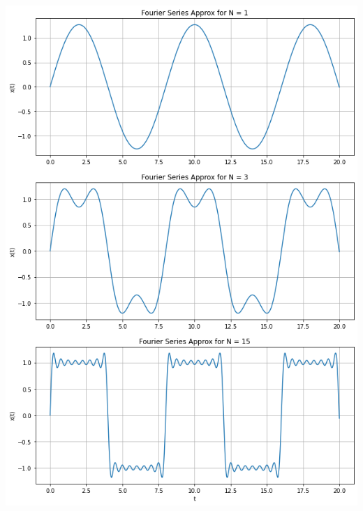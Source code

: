 \documentclass[12pt]{report}
\begin{document}
    \includegraphics[scale=0.6]{fourier1.png}
    
\end{document}
